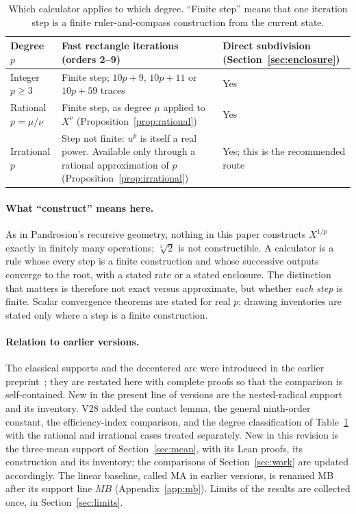 \documentclass[10pt,a4paper]{article}
\theoremstyle{plain}
\theoremstyle{remark}
\numberwithin{equation}{section}
\begin{document}
\begin{table}[h]
\centering\small
\caption{Which calculator applies to which degree. ``Finite step'' means that one iteration step is a
finite ruler-and-compass construction from the current state.}\label{tab:degrees}
\begin{tabularx}{\linewidth}{@{}lXX@{}}
\toprule
Degree $p$ & Fast rectangle iterations (orders 2--9) & Direct subdivision (Section~\ref{sec:enclosure})\\
\midrule
Integer $p\ge 3$ & Finite step; $10p+9$, $10p+11$ or $10p+59$ traces & Yes\\
Rational $p=\mu/\nu$ & Finite step, as degree $\mu$ applied to $X^{\nu}$ (Proposition~\ref{prop:rational}) & Yes\\
Irrational $p$ & Step not finite: $u^{p}$ is itself a real power. Available only through a rational
approximation of $p$ (Proposition~\ref{prop:irrational}) & Yes; this is the recommended route\\
\bottomrule
\end{tabularx}
\end{table}

\paragraph{What ``construct'' means here.}
As in Pandrosion's recursive geometry, nothing in this paper constructs $X^{1/p}$ exactly in finitely
many operations; $\sqrt[3]{2}$ is not constructible. A calculator is a rule whose every step is a finite
construction and whose successive outputs converge to the root, with a stated rate or a stated
enclosure. The distinction that matters is therefore not exact versus approximate, but whether
\emph{each step} is finite. Scalar convergence theorems are stated for real $p$; drawing inventories are
stated only where a step is a finite construction.

\paragraph{Relation to earlier versions.}
The classical supports and the decentered arc were introduced in the earlier preprint~\cite{v20}; they
are restated here with complete proofs so that the comparison is self-contained. New in the present line
of versions are the nested-radical support and its inventory. V28 added the contact lemma,
the general ninth-order constant, the efficiency-index
comparison, and the degree classification of Table~\ref{tab:degrees} with the rational and irrational
cases treated separately. New in this revision is the three-mean support of Section~\ref{sec:mean},
with its Lean proofs, its construction and its inventory; the comparisons of Section~\ref{sec:work} are
updated accordingly. The linear baseline, called MA in earlier versions, is renamed MB after its
support line $MB$ (Appendix~\ref{app:mb}). Limits of the results are collected once, in
Section~\ref{sec:limits}.
\end{document}

